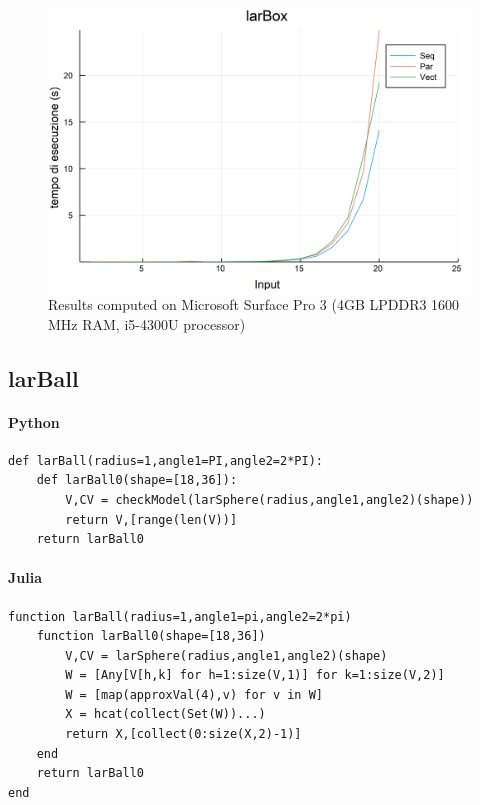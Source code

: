 \documentclass{article}
\begin{document}
\begin{figure}[htbp] 
\centering 
\includegraphics[scale=.13]{larBoxTime.png} 
\caption{Results computed on Microsoft Surface Pro  3 (4GB LPDDR3 1600 MHz RAM, i5-4300U processor)} 
\end{figure}
\subsection{larBall}

\paragraph{Python}

\begin{verbatim}
def larBall(radius=1,angle1=PI,angle2=2*PI):
    def larBall0(shape=[18,36]):
        V,CV = checkModel(larSphere(radius,angle1,angle2)(shape))
        return V,[range(len(V))]
    return larBall0
\end{verbatim}

\paragraph{Julia}

\begin{verbatim}
function larBall(radius=1,angle1=pi,angle2=2*pi)
    function larBall0(shape=[18,36])
        V,CV = larSphere(radius,angle1,angle2)(shape)
        W = [Any[V[h,k] for h=1:size(V,1)] for k=1:size(V,2)]
        W = [map(approxVal(4),v) for v in W]
        X = hcat(collect(Set(W))...)
        return X,[collect(0:size(X,2)-1)]
    end
    return larBall0
end
\end{verbatim}
\end{document}
